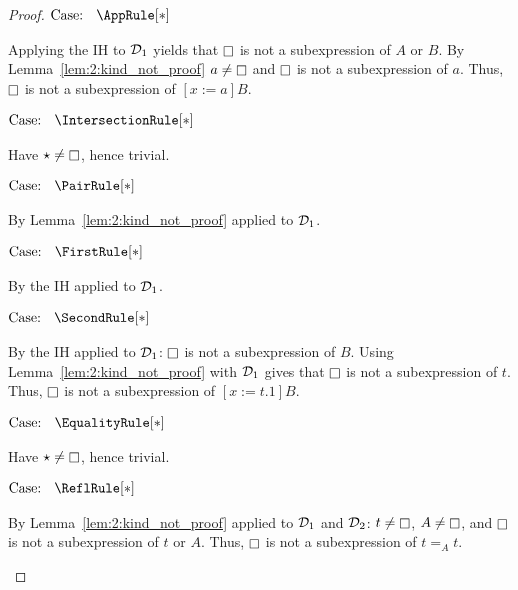 \begin{proof}
    $\text{Case: }\begin{array}{c} \AppRule[*] \end{array}$
    \begin{proofcase}
        Applying the IH to $\mathcal{D}_{1}$ yields that $\kind$ is not a subexpression of $A$ or $B$.
        By Lemma~\ref{lem:2:kind_not_proof} $a \neq \kind$ and $\kind$ is not a subexpression of $a$.
        Thus, $\kind$ is not a subexpression of $[x := a]B$.
    \end{proofcase}

    $\text{Case: }\begin{array}{c} \IntersectionRule[*] \end{array}$
    \begin{proofcase}
        Have $\star \neq \kind$, hence trivial.
    \end{proofcase}

    $\text{Case: }\begin{array}{c} \PairRule[*] \end{array}$
    \begin{proofcase}
        By Lemma~\ref{lem:2:kind_not_proof} applied to $\mathcal{D}_{1}$.
    \end{proofcase}

    $\text{Case: }\begin{array}{c} \FirstRule[*] \end{array}$
    \begin{proofcase}
        By the IH applied to $\mathcal{D}_{1}$.
    \end{proofcase}

    $\text{Case: }\begin{array}{c} \SecondRule[*] \end{array}$
    \begin{proofcase}
        By the IH applied to $\mathcal{D}_{1}$: $\kind$ is not a subexpression of $B$.
        Using Lemma~\ref{lem:2:kind_not_proof} with $\mathcal{D}_{1}$ gives that $\kind$ is not a subexpression of $t$.
        Thus, $\kind$ is not a subexpression of $[x := t.1]B$.
    \end{proofcase}

    $\text{Case: }\begin{array}{c} \EqualityRule[*] \end{array}$
    \begin{proofcase}
        Have $\star \neq \kind$, hence trivial.
    \end{proofcase}

    $\text{Case: }\begin{array}{c} \ReflRule[*] \end{array}$
    \begin{proofcase}
        By Lemma~\ref{lem:2:kind_not_proof} applied to $\mathcal{D}_{1}$ and $\mathcal{D}_{2}$: $t \neq \kind$, $A \neq \kind$, and $\kind$ is not a subexpression of $t$ or $A$.
        Thus, $\kind$ is not a subexpression of $t =_A t$.
    \end{proofcase}


\end{proof}
